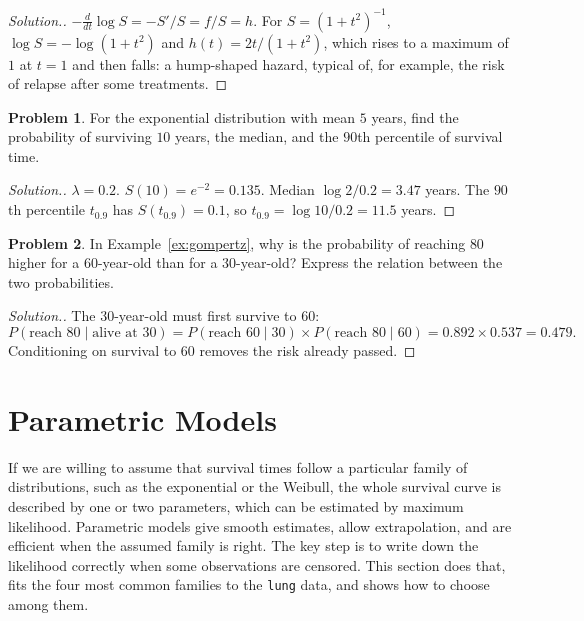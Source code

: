 \documentclass[11pt,a4paper]{article}
\numberwithin{equation}{section}
\theoremstyle{definition}
\newtheorem{problemx}{Problem}[subsection]
\newenvironment{problem}{\begin{problemx}}{\end{problemx}}
\newenvironment{solution}
  {\renewcommand{\qedsymbol}{}\begin{proof}[\textit{Solution}.]}
  {\end{proof}}
\begin{document}
\begin{solution}
$-\frac{d}{dt}\log S = -S'/S = f/S = h$. For $S = (1 + t^2)^{-1}$, $\log S = -\log(1 + t^2)$ and $h(t) = 2t/(1 + t^2)$, which rises to a maximum of $1$ at $t = 1$ and then falls: a hump-shaped hazard, typical of, for example, the risk of relapse after some treatments.
\end{solution}

\begin{problem}
For the exponential distribution with mean $5$ years, find the probability of surviving $10$ years, the median, and the $90$th percentile of survival time.
\end{problem}

\begin{solution}
$\lambda = 0.2$. $S(10) = e^{-2} = 0.135$. Median $\log 2/0.2 = 3.47$ years. The $90$th percentile $t_{0.9}$ has $S(t_{0.9}) = 0.1$, so $t_{0.9} = \log 10/0.2 = 11.5$ years.
\end{solution}

\begin{problem}
In Example~\ref{ex:gompertz}, why is the probability of reaching $80$ higher for a $60$-year-old than for a $30$-year-old? Express the relation between the two probabilities.
\end{problem}

\begin{solution}
The $30$-year-old must first survive to $60$:
\[
P(\text{reach } 80 \mid \text{alive at } 30) = P(\text{reach } 60 \mid 30) \times P(\text{reach } 80 \mid 60) = 0.892 \times 0.537 = 0.479 .
\] Conditioning on survival to $60$ removes the risk already passed.
\end{solution}

\section{Parametric Models}
\label{sec:parametric}

If we are willing to assume that survival times follow a particular family of distributions, such as the exponential or the Weibull, the whole survival curve is described by one or two parameters, which can be estimated by maximum likelihood. Parametric models give smooth estimates, allow extrapolation, and are efficient when the assumed family is right. The
key step is to write down the likelihood correctly when some observations are censored. This section does that, fits the four most common families to the \texttt{lung} data, and shows how to choose among them.
\end{document}

